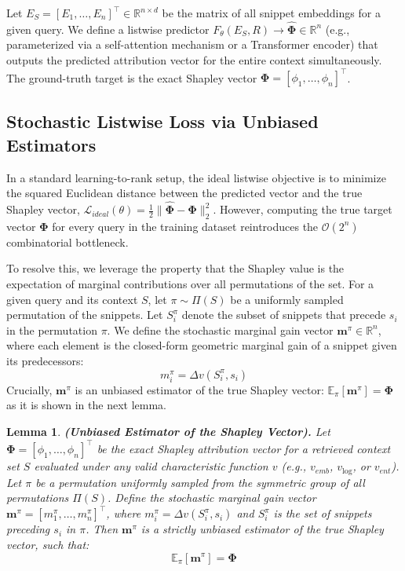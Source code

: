 \documentclass{article}
\newtheorem{lemma}[theorem]{Lemma}
\begin{document}
Let $E_S = [E_1, \dots, E_n]^\top \in \mathbb{R}^{n \times d}$ be the matrix of all snippet embeddings for a given query. We define a listwise predictor $F_\theta(E_S, R) \to \hat{\mathbf{\Phi}} \in \mathbb{R}^n$ (e.g., parameterized via a self-attention mechanism or a Transformer encoder) that outputs the predicted attribution vector for the entire context simultaneously. The ground-truth target is the exact Shapley vector $\mathbf{\Phi} = [\phi_1, \dots, \phi_n]^\top$.

\subsection{Stochastic Listwise Loss via Unbiased Estimators}

In a standard learning-to-rank setup, the ideal listwise objective is to minimize the squared Euclidean distance between the predicted vector and the true Shapley vector, $\mathcal{L}_{ideal}(\theta) = \frac{1}{2} \| \hat{\mathbf{\Phi}} - \mathbf{\Phi} \|_2^2$. However, computing the true target vector $\mathbf{\Phi}$ for every query in the training dataset reintroduces the $\mathcal{O}(2^n)$ combinatorial bottleneck. 

To resolve this, we leverage the property that the Shapley value is the expectation of marginal contributions over all permutations of the set. For a given query and its context $S$, let $\pi \sim \Pi(S)$ be a uniformly sampled permutation of the snippets. Let $S_i^\pi$ denote the subset of snippets that precede $s_i$ in the permutation $\pi$. We define the stochastic marginal gain vector $\mathbf{m}^\pi \in \mathbb{R}^n$, where each element is the closed-form geometric marginal gain of a snippet given its predecessors:
$$ m_i^\pi = \Delta v (S_i^\pi, s_i) $$
Crucially, $\mathbf{m}^\pi$ is an unbiased estimator of the true Shapley vector: $\mathbb{E}_{\pi}[\mathbf{m}^\pi] = \mathbf{\Phi}$ as it is shown in the next lemma. 


\begin{lemma}\label{lemma:unbiased_estimator}
\textbf{(Unbiased Estimator of the Shapley Vector).} 
Let $\mathbf{\Phi} = [\phi_1, \dots, \phi_n]^\top$ be the exact Shapley attribution vector for a retrieved context set $S$ evaluated under any valid characteristic function $v$ (e.g., $v_{emb}$, $v_{\log}$, or $v_{ent}$). Let $\pi$ be a permutation uniformly sampled from the symmetric group of all permutations $\Pi(S)$. Define the stochastic marginal gain vector $\mathbf{m}^\pi = [m_1^\pi, \dots, m_n^\pi]^\top$, where $m_i^\pi = \Delta v(S_i^\pi, s_i)$ and $S_i^\pi$ is the set of snippets preceding $s_i$ in $\pi$. Then $\mathbf{m}^\pi$ is a strictly unbiased estimator of the true Shapley vector, such that:
$$ \mathbb{E}_{\pi}[\mathbf{m}^\pi] = \mathbf{\Phi} $$
\end{lemma}
\end{document}
